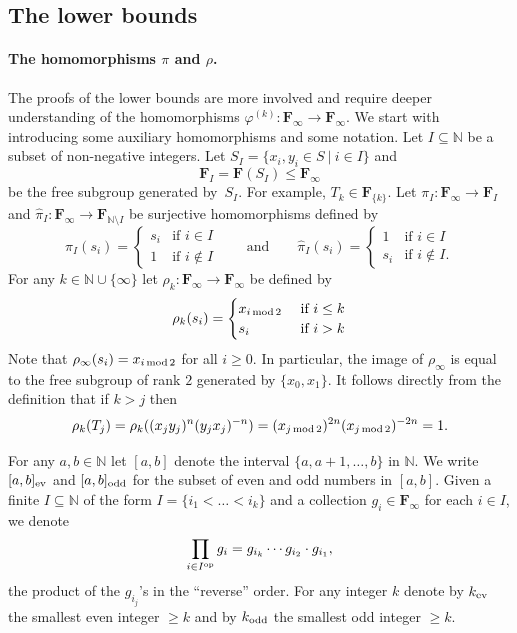 \documentclass[12pt,reqno,a4paper]{article}
\theoremstyle{definition}
\theoremstyle{remark}
\numberwithin{equation}{section}
\numberwithin{figure}{section}
\newcommand{\B}[1]{{\mathbf #1}}
\begin{document}
\subsection{The lower bounds}

\paragraph{The homomorphisms $\pi$ and $\rho$.}
The proofs of the lower bounds are more involved and require deeper understanding
of the homomorphisms $\varphi^{(k)}\colon \B F_{\infty}\to \B F_{\infty}$.
We start with introducing some auxiliary homomorphisms and some notation. 
Let $I\subseteq \mathbb N$ be 
a subset of non-negative integers. Let $S_I = \{x_i,y_i\in S\ |\ i\in I\}$
and 
\[ 
\B F_I = \B F(S_I)\leq \B F_{\infty}
\]
 be the free subgroup generated by~$S_I$.
For example, $T_k \in \B F_{\{ k\}}$.
Let $\pi_I\colon \B F_{\infty}\to \B F_I$ and 
$\widehat{\pi}_I\colon \B F_{\infty}\to \B F_{\mathbb N\setminus I}$
be surjective homomorphisms defined by
$$
\pi_I(s_i)=
\begin{cases}
s_i & \text{if $i\in I$}\\
1 & \text{if $i\notin I$}
\end{cases}
\qquad\text{and}\qquad
\widehat{\pi}_I(s_i)=
\begin{cases}
1 & \text{if $i\in I$}\\
s_i & \text{if $i\notin I$}.
\end{cases}
$$
For any $k\in \mathbb N\cup \{\infty\}$ let 
$\rho_k\colon \B F_{\infty}\to \B F_{\infty}$ be defined by
$$
\rho_k(s_i) =
\begin{cases}
x_{i\,{\rm mod}\,2} &\text{ if }i\leq k\\
s_i &\text{ if } i>k
\end{cases}
$$
Note that $\rho_{\infty}(s_i) = x_{i\,{\rm mod}\,2}$ for all $i \geq 0$.
In particular,
the image of $\rho_{\infty}$ is equal to the free subgroup of rank $2$ generated by $\{x_0,x_1\}$.
It follows directly from the definition that if $k>j$ then 
\begin{equation}\label{eqn:phi_k(T_j)}
\rho_k(T_j) =
\rho_k((x_jy_j)^n (y_jx_j)^{-n}) =
(x_{j \, {\rm mod} \, 2})^{2n} (x_{j \, {\rm mod} \, 2})^{-2n} =1.
\end{equation}


For any $a,b \in \mathbb N$ let $[a,b]$ denote the interval $\{a, a+1, \dots, b\}$ in $\mathbb{N}$.
We write $[a,b]_{\rm ev}$ and $[a,b]_{\rm odd}$ for the subset of even and odd numbers in $[a,b]$.
Given a finite $I \subseteq \mathbb N$ of the form $I=\{i_1< \dots < i_k\}$ and a collection $g_i \in \B F_\infty$ for each $i \in I$, we denote
\[
\prod_{i \in I^{\rm op}} g_i = g_{i_k} \cdots g_{i_2} \cdot g_{i_1},
\]
the product of the $g_{i_j}$'s in the ``reverse'' order.
For any integer $k$ denote by $k_{\rm ev}$ the smallest even integer $\geq k$ and by $k_{\rm odd}$ the smallest odd integer $\geq k$.
\end{document}
